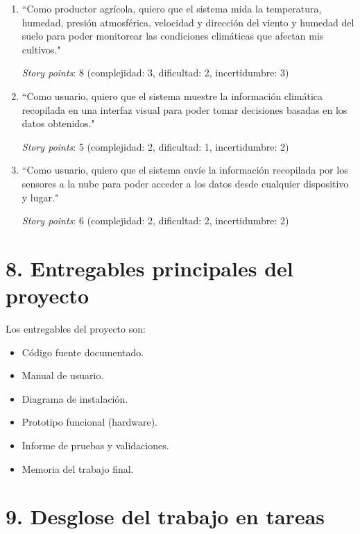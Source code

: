 \documentclass[
11pt, %
codirector, %
]{charter}
\begin{document}
\begin{enumerate}

\item ``Como productor agrícola, quiero que el sistema mida la temperatura, humedad, presión atmosférica, velocidad y dirección del viento y humedad del suelo para poder monitorear las condiciones climáticas que afectan mis cultivos."

\textit{Story points}: 8 (complejidad: 3, dificultad: 2, incertidumbre: 3)

\item ``Como usuario, quiero que el sistema muestre la información climática recopilada en una interfaz visual para poder tomar decisiones basadas en los datos obtenidos."

\textit{Story points}: 5 (complejidad: 2, dificultad: 1, incertidumbre: 2)

\item ``Como usuario, quiero que el sistema envíe la información recopilada por los sensores a la nube para poder acceder a los datos desde cualquier dispositivo y lugar."

\textit{Story points}: 6 (complejidad: 2, dificultad: 2, incertidumbre: 2)

\end{enumerate}

\section{8. Entregables principales del proyecto}
\label{sec:entregables}

Los entregables del proyecto son:

\begin{itemize}
	\item Código fuente documentado.
	\item Manual de usuario.
	\item Diagrama de instalación.
	\item Prototipo funcional (hardware).
	\item Informe de pruebas y validaciones.
	\item Memoria del trabajo final.
\end{itemize}

\section{9. Desglose del trabajo en tareas}
\label{sec:wbs}
\end{document}
